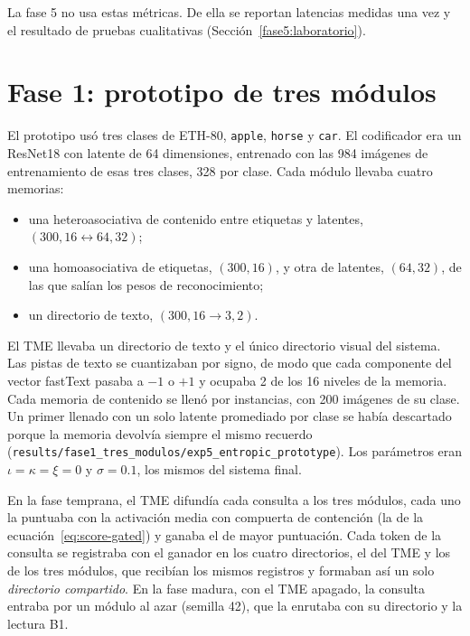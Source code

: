 La fase 5 no usa estas métricas.
De ella se reportan latencias medidas una vez y el resultado de pruebas cualitativas
(Sección~\ref{fase5:laboratorio}).

\section{Fase 1: prototipo de tres módulos}
\label{fase1:prototipo}

El prototipo usó tres clases de ETH-80, \texttt{apple}, \texttt{horse} y \texttt{car}.
El codificador era un ResNet18 con latente de 64 dimensiones, entrenado con las 984
imágenes de entrenamiento de esas tres clases, 328 por clase.
Cada módulo llevaba cuatro memorias:
\begin{itemize}
    \item una heteroasociativa de contenido entre etiquetas y latentes,
    $(300, 16 \leftrightarrow 64, 32)$;
    \item una homoasociativa de etiquetas, $(300, 16)$, y otra de latentes, $(64, 32)$,
    de las que salían los pesos de reconocimiento;
    \item un directorio de texto, $(300, 16 \to 3, 2)$.
\end{itemize}
El TME llevaba un directorio de texto y el único directorio visual del sistema.
Las pistas de texto se cuantizaban por signo, de modo que cada componente del vector
fastText pasaba a $-1$ o $+1$ y ocupaba 2 de los 16 niveles de la memoria.
Cada memoria de contenido se llenó por instancias, con 200 imágenes de su clase.
Un primer llenado con un solo latente promediado por clase se había descartado porque
la memoria devolvía siempre el mismo recuerdo
(\texttt{results/fase1\_tres\_modulos/exp5\_entropic\_prototype}).
Los parámetros eran $\iota = \kappa = \xi = 0$ y $\sigma = 0.1$, los mismos del sistema
final.

En la fase temprana, el TME difundía cada consulta a los tres módulos, cada uno la
puntuaba con la activación media con compuerta de contención (la de la
ecuación~\eqref{eq:score-gated}) y ganaba el de mayor puntuación.
Cada token de la consulta se registraba con el ganador en los cuatro directorios, el
del TME y los de los tres módulos, que recibían los mismos registros y formaban así un
solo \emph{directorio compartido}.
En la fase madura, con el TME apagado, la consulta entraba por un módulo al azar
(semilla 42), que la enrutaba con su directorio y la lectura B1.

